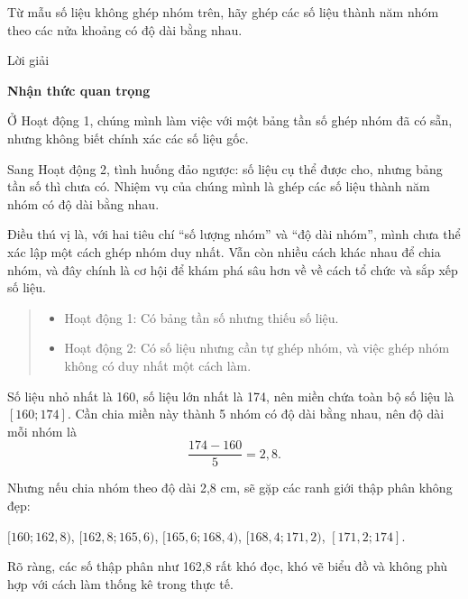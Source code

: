 \documentclass[
  letterpaper,
  DIV=11,
  numbers=noendperiod]{scrartcl}
\providecommand{\tightlist}{%
  \setlength{\itemsep}{0pt}\setlength{\parskip}{0pt}}\usepackage{longtable,booktabs,array}
\begin{document}
Từ mẫu số liệu không ghép nhóm trên, hãy ghép các số liệu thành năm nhóm
theo các nửa khoảng có độ dài bằng nhau.

\begin{center}
Lời giải
\end{center}

\begin{tcolorbox}[enhanced jigsaw, toprule=.15mm, colback=white, bottomrule=.15mm, opacityback=0, leftrule=.75mm, rightrule=.15mm, colframe=quarto-callout-note-color-frame, arc=.35mm, breakable, left=2mm]

\vspace{-3mm}\textbf{Nhận thức quan trọng}\vspace{3mm}

Ở Hoạt động 1, chúng mình làm việc với một bảng tần số ghép nhóm đã có
sẵn, nhưng không biết chính xác các số liệu gốc.

Sang Hoạt động 2, tình huống đảo ngược: số liệu cụ thể được cho, nhưng
bảng tần số thì chưa có. Nhiệm vụ của chúng mình là ghép các số liệu
thành năm nhóm có độ dài bằng nhau.

Điều thú vị là, với hai tiêu chí ``số lượng nhóm'' và ``độ dài nhóm'',
mình chưa thể xác lập một cách ghép nhóm duy nhất. Vẫn còn nhiều cách
khác nhau để chia nhóm, và đây chính là cơ hội để khám phá sâu hơn về về
cách tổ chức và sắp xếp số liệu.

\begin{quote}
\begin{itemize}
\tightlist
\item
  Hoạt động 1: Có bảng tần số nhưng thiếu số liệu.
\item
  Hoạt động 2: Có số liệu nhưng cần tự ghép nhóm, và việc ghép nhóm
  không có duy nhất một cách làm.
\end{itemize}
\end{quote}

\end{tcolorbox}

Số liệu nhỏ nhất là 160, số liệu lớn nhất là 174, nên miền chứa toàn bộ
số liệu là \([160; 174]\). Cần chia miền này thành 5 nhóm có độ dài bằng
nhau, nên độ dài mỗi nhóm là \[
    \frac{174-160}{5}=2,8.
\]

Nhưng nếu chia nhóm theo độ dài 2,8 cm, sẽ gặp các ranh giới thập phân
không đẹp:

\([160;162,8)\), \([162,8;165,6)\), \([165,6;168,4)\),
\([168,4;171,2)\), \([171,2;174]\).

Rõ ràng, các số thập phân như 162,8 rất khó đọc, khó vẽ biểu đồ và không
phù hợp với cách làm thống kê trong thực tế.
\end{document}
